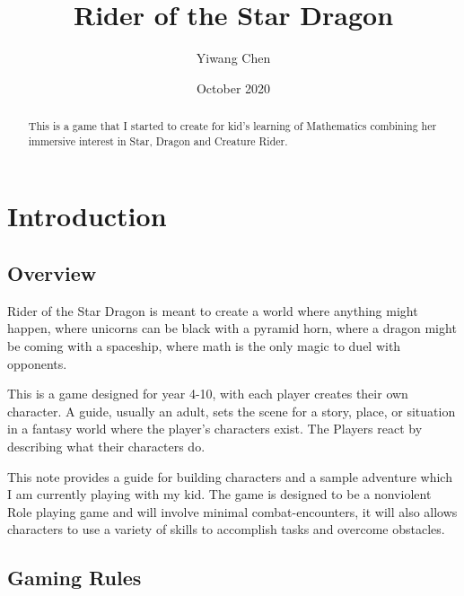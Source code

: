\documentclass[a4paper,12pt]{article}
\title{Rider of the Star Dragon}
\author{Yiwang Chen}
\date{October 2020}
\begin{document}
\maketitle

\begin{abstract}
This is a game that I started to create for kid's learning of Mathematics combining her immersive interest in Star, Dragon and Creature Rider.
\end{abstract}


\section{Introduction}
\subsection{Overview}

Rider of the Star Dragon is meant to create a world where anything might happen, where unicorns can be black with a pyramid horn, where a dragon might be coming with a spaceship, where math is the only magic to duel with opponents. 

This is a game designed for year 4-10, with each player creates their own character.
A guide, usually an adult, sets the scene for a story, place, or situation in a fantasy world where the player’s characters exist.
The Players react by describing what their characters do.

This note provides a guide for building characters and a sample adventure which I am currently playing with my kid. The game is designed to be a nonviolent Role playing game and will involve minimal combat-encounters, it will also allows characters to use a variety of skills to accomplish tasks and overcome obstacles.
\subsection{Gaming Rules}
\end{document}
